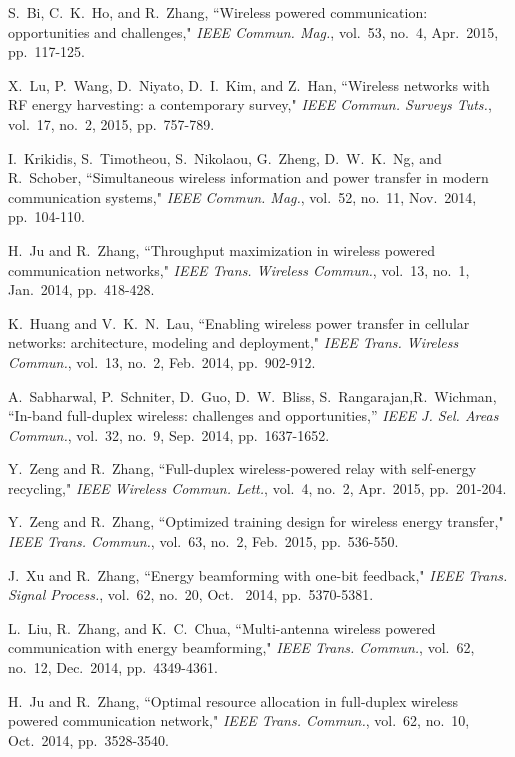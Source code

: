 \documentclass[journal, draftcls, one column, 12pt]{IEEEtran}
\begin{document}
\begin{thebibliography}{1}
\small

S.~Bi, C.~K.~Ho, and R.~Zhang, ``Wireless powered communication: opportunities and challenges," \emph{IEEE Commun. Mag.}, vol.~53, no.~4, Apr.~2015, pp.~117-125.

X.~Lu, P.~Wang, D.~Niyato, D.~I.~Kim, and Z.~Han, ``Wireless networks with RF energy harvesting: a contemporary survey," \emph{IEEE Commun. Surveys Tuts.}, vol.~17, no.~2, 2015, pp.~757-789.

I.~Krikidis, S.~Timotheou, S.~Nikolaou, G.~Zheng, D.~W.~K.~Ng, and R.~Schober, ``Simultaneous wireless information and power transfer in modern communication systems," \emph{IEEE Commun. Mag.}, vol.~52, no.~11, Nov.~2014, pp.~104-110.

H.~Ju and R.~Zhang, ``Throughput maximization in wireless powered communication networks," \emph{IEEE Trans. Wireless Commun.}, vol.~13, no.~1, Jan.~2014, pp.~418-428.

K.~Huang and V.~K.~N.~Lau, ``Enabling wireless power transfer in cellular networks: architecture, modeling and deployment," \emph{IEEE Trans. Wireless Commun.}, vol.~13, no.~2, Feb.~2014, pp.~902-912.

A.~Sabharwal, P.~Schniter, D.~Guo, D.~W.~Bliss, S.~Rangarajan,R.~Wichman, ``In-band full-duplex wireless: challenges and opportunities,'' \emph{IEEE J. Sel. Areas Commun.}, vol.~32, no.~9, Sep.~2014, pp.~1637-1652.

Y.~Zeng and R.~Zhang, ``Full-duplex wireless-powered relay with self-energy recycling," \emph{IEEE Wireless Commun. Lett.}, vol.~4, no.~2, Apr.~2015, pp.~201-204.

Y.~Zeng and R.~Zhang, ``Optimized training design for wireless energy transfer," \emph{IEEE Trans. Commun.}, vol.~63, no.~2, Feb.~2015, pp.~536-550.

J.~Xu and R.~Zhang, ``Energy beamforming with one-bit feedback," \emph{IEEE Trans. Signal Process.}, vol.~62, no.~20, Oct.~ 2014, pp.~5370-5381.

L.~Liu, R.~Zhang, and K.~C.~Chua, ``Multi-antenna wireless powered communication with energy beamforming," \emph{IEEE Trans. Commun.}, vol.~62, no.~12, Dec.~2014, pp.~4349-4361.

H.~Ju and R.~Zhang, ``Optimal resource allocation in full-duplex wireless powered communication network," \emph{IEEE Trans. Commun.}, vol.~62, no.~10, Oct.~2014, pp.~3528-3540.


\end{thebibliography}
\end{document}
